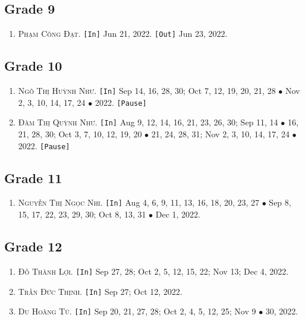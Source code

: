 \documentclass{article}
\numberwithin{equation}{section}
\begin{document}
\subsection{Grade 9}
\begin{enumerate}
	\item \textsc{Phạm Công Đạt.} \texttt{[In]} Jun 21, 2022. \texttt{[Out]} Jun 23, 2022.
\end{enumerate}

\subsection{Grade 10}
\begin{enumerate}
	\item \textsc{Ngô Thị Huỳnh Như.} \texttt{[In]} Sep 14, 16, 28, 30; Oct 7, 12, 19, 20, 21, 28 $\bullet$ Nov 2, 3, 10, 14, 17, 24 $\bullet$ 2022. \texttt{[Pause]}
	\item \textsc{Đàm Thị Quỳnh Như.} \texttt{[In]} Aug 9, 12, 14, 16, 21, 23, 26, 30; Sep 11, 14 $\bullet$ 16, 21, 28, 30; Oct 3, 7, 10, 12, 19, 20 $\bullet$ 21, 24, 28, 31; Nov 2, 3, 10, 14, 17, 24 $\bullet$ 2022. \texttt{[Pause]}
\end{enumerate}

\subsection{Grade 11}
\begin{enumerate}
	\item \textsc{Nguyễn Thị Ngọc Nhi.} \texttt{[In]} Aug 4, 6, 9, 11, 13, 16, 18, 20, 23, 27 $\bullet$ Sep 8, 15, 17, 22, 23, 29, 30; Oct 8, 13, 31 $\bullet$ Dec 1, 2022.
\end{enumerate}

\subsection{Grade 12}
\begin{enumerate}
	\item \textsc{Đỗ Thành Lợi.} \texttt{[In]} Sep 27, 28; Oct 2, 5, 12, 15, 22; Nov 13; Dec 4, 2022.
	\item \textsc{Trần Đức Thịnh.} \texttt{[In]} Sep 27; Oct 12, 2022.
	\item \textsc{Du Hoàng Tú.} \texttt{[In]} Sep 20, 21, 27, 28; Oct 2, 4, 5, 12, 25; Nov 9 $\bullet$ 30, 2022.
\end{enumerate}

\end{document}
